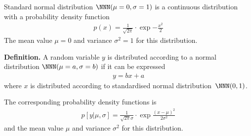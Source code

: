 \documentclass[landscape,footrule]{foils}
\begin{document}


Standard normal distribution $\NNN(\mu=0,\sigma=1)$ is a continuous distribution with a probability density function 
\begin{align*}
p(x)=\frac{1}{\sqrt{2\pi}}\cdot\exp{-\frac{x^2}{2}}
\end{align*}
The mean value $\mu=0$ and variance $\sigma^2=1$ for this distribution.



\textbf{Definition.}
A random variable $y$ is distributed according to a normal distribution $\NNN(\mu=a,\sigma=b)$ if it can be expressed 
\begin{align*}
y=bx+a
\end{align*}
where $x$ is distributed according to standardised normal distribution~$\NNN(0,1)$. \vspace*{1cm}

The corresponding probability density functions is
\begin{align*}
p[y|\mu,\sigma]=\frac{1}{\sqrt{2\pi}\sigma}\cdot\exp{\frac{(x-\mu)^2}{2\sigma^2}}
\end{align*}
and the mean value $\mu$ and variance $\sigma^2$ for this distribution.


\end{document}
